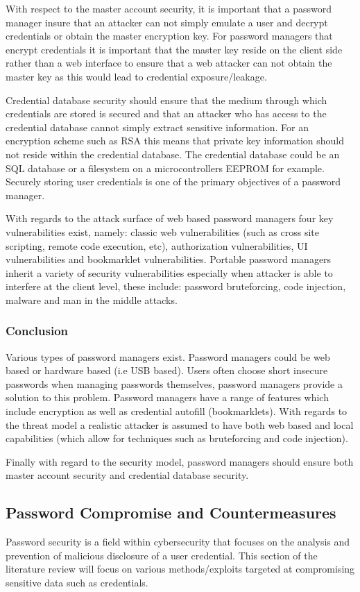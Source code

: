 With respect to the master account security, it is important that a password manager insure that an attacker can not simply emulate a user and decrypt credentials or obtain the master encryption key. For password managers that encrypt credentials it is important that the master key reside on the client side rather than a web interface to ensure that a web attacker can not obtain the master key as this would lead to credential exposure/leakage.

Credential database security should ensure that the medium through which credentials are stored is secured and that an attacker who has access to the credential database cannot simply extract sensitive information. For an encryption scheme such as RSA this means that private key information should not reside within the credential database. The credential database could be an SQL database or a filesystem on a microcontrollers EEPROM for example. Securely storing user credentials is one of the primary objectives of a password manager.

With regards to the attack surface of web based password managers four key vulnerabilities exist, namely: classic web vulnerabilities (such as cross site scripting, remote code execution, etc), authorization vulnerabilities, UI vulnerabilities and bookmarklet vulnerabilities. Portable password managers inherit a variety of security vulnerabilities especially when attacker is able to interfere at the client level, these include: password bruteforcing, code injection, malware and man in the middle attacks.

\subsubsection{Conclusion}
Various types of password managers exist. Password managers could be web based or hardware based (i.e USB based). Users often choose short insecure passwords when managing passwords themselves, password managers provide a solution to this problem. Password managers have a range of features which include encryption as well as credential autofill (bookmarklets). With regards to the threat model a realistic attacker is assumed to have both web based and local capabilities (which allow for techniques such as bruteforcing and code injection). 

Finally with regard to the security model, password managers should ensure both master account security and credential database security. 
\subsection{Password Compromise and Countermeasures}
Password security is a field within cybersecurity that focuses on the analysis and prevention of malicious disclosure of a user credential. This section of the literature review will focus on various methods/exploits targeted at compromising sensitive data such as credentials.

